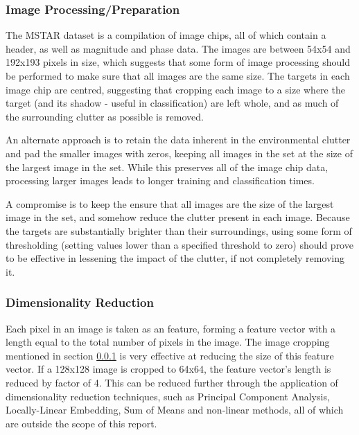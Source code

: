 \subsubsection{Image Processing/Preparation}\label{sec:cropping}
The MSTAR dataset is a compilation of image chips, all of which contain a header, as well as magnitude and phase data. The images are between 54x54 and 192x193 pixels in size, which suggests that some form of image processing should be performed to make sure that all images are the same size. The targets in each image chip are centred, suggesting that cropping each image to a size where the target (and its shadow - useful in classification) are left whole, and as much of the surrounding clutter as possible is removed.

An alternate approach is to retain the data inherent in the environmental clutter and pad the smaller images with zeros, keeping all images in the set at the size of the largest image in the set. While this preserves all of the image chip data, processing larger images leads to longer training and classification times.

A compromise is to keep the ensure that all images are the size of the largest image in the set, and somehow reduce the clutter present in each image. Because the targets are substantially brighter than their surroundings, using some form of thresholding (setting values lower than a specified threshold to zero) should prove to be effective in lessening the impact of the clutter, if not completely removing it.

\subsubsection{Dimensionality Reduction}
Each pixel in an image is taken as an feature, forming a feature vector with a length equal to the total number of pixels in the image. The image cropping mentioned in section \ref{sec:cropping} is very effective at reducing the size of this feature vector. If a 128x128 image is cropped to 64x64, the feature vector's length is reduced by factor of 4. This can be reduced further through the application of dimensionality reduction techniques, such as Principal Component Analysis, Locally-Linear Embedding, Sum of Means and non-linear methods, all of which are outside the scope of this report. 

